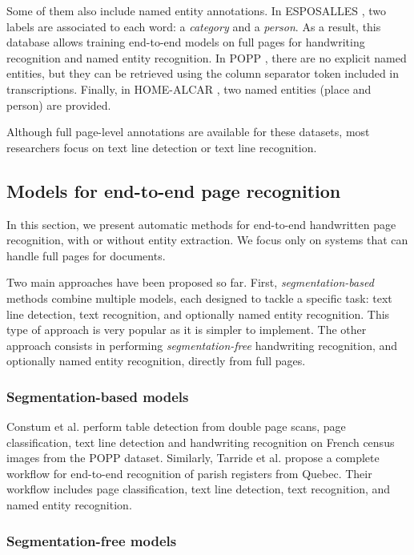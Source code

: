 \documentclass[runningheads]{llncs}
\begin{document}
Some of them also include named entity annotations. 
In ESPOSALLES \cite{iehhr2017}, two labels are associated to each word: a \textit{category} and a \textit{person}. As a result, this database allows training end-to-end models on full pages for handwriting recognition and named entity recognition. 
In POPP \cite{Constum-POPP}, there are no explicit named entities, but they can be retrieved using the column separator token included in transcriptions. 
Finally, in HOME-ALCAR \cite{HOME-ALCAR}, two named entities (place and person) are provided. 

Although full page-level annotations are available for these datasets, most researchers focus on text line detection or text line recognition.

\subsection{Models for end-to-end page recognition}

 In this section, we present automatic methods for end-to-end handwritten page recognition, with or without entity extraction. We focus only on systems that can handle full pages for documents.
 
Two main approaches have been proposed so far. First, \textit{segmentation-based} methods combine multiple models, each designed to tackle a specific task: text line detection, text recognition, and optionally named entity recognition. This type of approach is very popular as it is simpler to implement. 
The other approach consists in performing \textit{segmentation-free} handwriting recognition, and optionally named entity recognition, directly from full pages. 

\subsubsection{Segmentation-based models}

Constum et al. \cite{Constum-POPP} perform table detection from double page scans, page classification, text line detection and handwriting recognition on French census images from the POPP dataset. Similarly, Tarride et al. \cite{tarride2023} propose a complete workflow for end-to-end recognition of parish registers from Quebec. Their workflow includes page classification, text line detection, text recognition, and named entity recognition. 


\subsubsection{Segmentation-free models}
\end{document}
